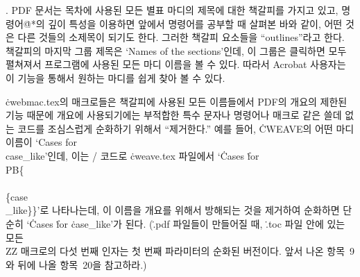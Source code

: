 {%
. {\mc PDF} 문서는 목차에 사용된 모든 별표 마디의 제목에 대한
책갈피를 가지고 있고, 명령어\.{@*}의 깊이 특성을 이용하면
앞에서 명령어를 공부할 때 살펴본 바와 같이, 어떤 것은 다른 것들의
소제목이 되기도 한다. 그러한 책갈피 요소들을 
``outlines''라고 한다. 책갈피의 마지막 그룹 제목은 `Names of the
sections'인데, 이 그룹은 클릭하면 모두 펼쳐져서 프로그램에 사용된 모든
마디 이름을 볼 수 있다. 따라서 Acrobat 사용자는 이 기능을 통해서
원하는 마디를 쉽게 찾아 볼 수 있다. 

\.{cwebmac.tex}의 매크로들은 책갈피에
사용된 모든 이름들에서 {\mc PDF}의 개요의 제한된 기능 때문에 개요에 사용되기에는 부적합한
특수 문자나 명령어나 매크로 같은 쓸데 없는 코드를 조심스럽게 순화하기 위해서 ``제거한다.''
예를 들어, \.{CWEAVE}의 어떤 마디 이름이 `Cases for \\{case\_like}'인데, 이는 \TEX/
코드로 \.{cweave.tex} 파일에서 `\.{Cases} \.{for}
\.{\\PB\{\\\\\{case\\\_like\}\}}'로 나타나는데, 이 이름을 개요를 위해서 방해되는 것을
제거하여 순화하면 단순히 `\.{Cases} \.{for} \.{case\_like}'가 된다. 
(\.{.pdf} 파일들이 만들어질 때, \.{.toc} 파일 안에 있는 모든 \.{\\ZZ}
매크로의 다섯 번째 인자는 첫 번째 파라미터의 순화된 버전이다. 앞서 나온
항목~9와 뒤에 나올 항목~20을 참고하라.)

}
